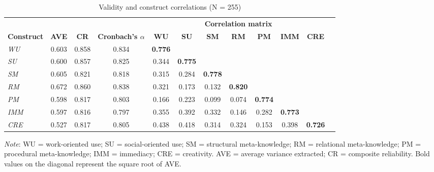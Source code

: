 \documentclass[authoryear,preprint,review,times,10pt]{elsarticle}
\begin{document}
\begin{table}[!htbp]
\centering
\captionsetup{font=normalsize, labelsep=period}
\setlength{\abovecaptionskip}{5pt}
\setlength{\belowcaptionskip}{0pt}
\caption{Validity and construct correlations (N = 255)}
\label{tab:validity}
\small
\begin{threeparttable}
\begin{tabular*}{0.9\textwidth}{@{\extracolsep{\fill}}lccccccccccc}
\toprule
 & & & & \multicolumn{7}{c}{\textbf{Correlation matrix}} \\
\cmidrule(l){5-11}
\textbf{Construct} & \textbf{AVE} & \textbf{CR} & \textbf{Cronbach's $\alpha$} & \textbf{WU} & \textbf{SU} & \textbf{SM} & \textbf{RM} & \textbf{PM} & \textbf{IMM} & \textbf{CRE} \\
\midrule
\textit{WU}  & 0.603 & 0.858 & 0.834 & \textbf{0.776} & & & & & & \\
\textit{SU}  & 0.600 & 0.857 & 0.825 & 0.344 & \textbf{0.775} & & & & & \\
\textit{SM}  & 0.605 & 0.821 & 0.818 & 0.315 & 0.284 & \textbf{0.778} & & & & \\
\textit{RM}  & 0.672 & 0.860 & 0.838 & 0.321 & 0.173 & 0.132 & \textbf{0.820} & & & \\
\textit{PM}  & 0.598 & 0.817 & 0.803 & 0.166 & 0.223 & 0.099 & 0.074 & \textbf{0.774} & & \\
\textit{IMM} & 0.597 & 0.816 & 0.797 & 0.355 & 0.392 & 0.332 & 0.146 & 0.282 & \textbf{0.773} & \\
\textit{CRE} & 0.527 & 0.817 & 0.805 & 0.438 & 0.418 & 0.314 & 0.324 & 0.153 & 0.398 & \textbf{0.726} \\
\bottomrule
\end{tabular*}
\begin{tablenotes}[flushleft]
\small\linespread{1}\selectfont
\item \textit{Note}: WU = work-oriented use; SU = social-oriented use; SM = structural meta-knowledge; RM = relational meta-knowledge; PM = procedural meta-knowledge; IMM = immediacy; CRE = creativity. AVE = average variance extracted; CR = composite reliability. Bold values on the diagonal represent the square root of AVE.
\end{tablenotes}
\end{threeparttable}
\end{table}
\end{document}
